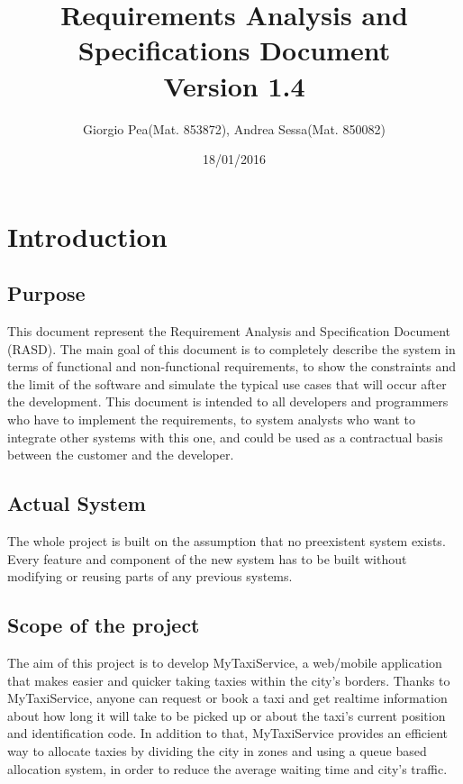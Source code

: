 \documentclass[11pt,titlepage]{article} %
\title{\textbf{R}equirements \textbf{A}nalysis and \textbf{S}pecifications \textbf{D}ocument \\ \vspace{1cm} \large{Version 1.4}}
\author{Giorgio Pea(Mat. 853872), Andrea Sessa(Mat. 850082)}
\date{18/01/2016} %
\begin{document}
\maketitle
\newpage

\tableofcontents

\newpage

\section{Introduction}
  \subsection{Purpose}
    This document represent the Requirement Analysis and Specification Document
    (RASD). The main goal of this document is to completely describe the system
    in terms of functional and non-functional requirements, to show the constraints and the limit
    of the software and simulate the typical use cases that will occur after the
    development. This document is intended to all developers and programmers who
    have to implement the requirements, to system analysts who want to integrate
    other systems with this one, and could be used as a contractual basis between
    the customer and the developer.

  \subsection{Actual System}
    The whole project is built on the assumption that no preexistent system exists.
    Every feature and component of the new system has to be built without modifying
    or reusing parts of any previous systems.

  \subsection{Scope of the project}
    The aim of this project is to develop MyTaxiService, a web/mobile application that makes easier and quicker taking taxies
    within the city's borders.
    Thanks to MyTaxiService, anyone can request or book a taxi and get realtime information
    about how long it will take to be picked up or about the taxi's current position and identification
    code.
    In addition to that, MyTaxiService provides an efficient way to allocate taxies by dividing the
    city in zones and using a queue based allocation system, in order to reduce the average
    waiting time and city's traffic.
\end{document}
